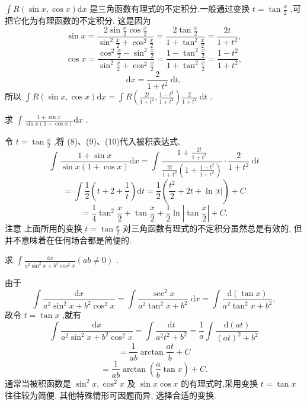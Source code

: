 \(\int R\left( {\sin x,\cos x}\right) \mathrm{d}x\) 是三角函数有理式的不定积分.一般通过变换 \(t = \tan \frac{x}{2}\) ,可把它化为有理函数的不定积分. 这是因为
\[
\sin x = \frac{2\sin \frac{x}{2}\cos \frac{x}{2}}{{\sin }^{2}\frac{x}{2} + {\cos }^{2}\frac{x}{2}} = \frac{2\tan \frac{x}{2}}{1 + {\tan }^{2}\frac{x}{2}} = \frac{2t}{1 + {t}^{2}}, \tag{8}
\]
\[
\cos x = \frac{{\cos }^{2}\frac{x}{2} - {\sin }^{2}\frac{x}{2}}{{\sin }^{2}\frac{x}{2} + {\cos }^{2}\frac{x}{2}} = \frac{1 - {\tan }^{2}\frac{x}{2}}{1 + {\tan }^{2}\frac{x}{2}} = \frac{1 - {t}^{2}}{1 + {t}^{2}}, \tag{9}
\]
\[
\mathrm{d}x = \frac{2}{1 + {t}^{2}}\mathrm{\;d}t, \tag{10}
\]
所以 \(\int R\left( {\sin x,\cos x}\right) \mathrm{d}x = \int R\left( {\frac{2t}{1 + {t}^{2}},\frac{1 - {t}^{2}}{1 + {t}^{2}}}\right) \frac{2}{1 + {t}^{2}}\mathrm{\;d}t\) .

\begin{example}

\end{example}
求 \(\int \frac{1 + \sin x}{\sin x\left( {1 + \cos x}\right) }\mathrm{d}x\) .

\begin{solution}

\end{solution}
令 \(t = \tan \frac{x}{2}\) ,将 (8)、(9)、(10)代入被积表达式,
\[
\int \frac{1 + \sin x}{\sin x\left( {1 + \cos x}\right) }\mathrm{d}x = \int \frac{1 + \frac{2t}{1 + {t}^{2}}}{\frac{2t}{1 + {t}^{2}}\left( {1 + \frac{1 - {t}^{2}}{1 + {t}^{2}}}\right) } \cdot  \frac{2}{1 + {t}^{2}}\mathrm{\;d}t
\]
\[
= \int \frac{1}{2}\left( {t + 2 + \frac{1}{t}}\right) \mathrm{d}t = \frac{1}{2}\left( {\frac{{t}^{2}}{2} + {2t} + \ln \left| t\right| }\right)  + C
\]
\[
= \frac{1}{4}{\tan }^{2}\frac{x}{2} + \tan \frac{x}{2} + \frac{1}{2}\ln \left| {\tan \frac{x}{2}}\right|  + C.
\]
注意 上面所用的变换 \(t = \tan \frac{x}{2}\) 对三角函数有理式的不定积分虽然总是有效的, 但并不意味着在任何场合都是简便的.

\begin{example}

\end{example}
求 \(\int \frac{\mathrm{d}x}{{a}^{2}{\sin }^{2}x + {b}^{2}{\cos }^{2}x}\left( {{ab} \neq  0}\right)\) .

\begin{solution}

\end{solution}
由于
\[
\int \frac{\mathrm{d}x}{{a}^{2}{\sin }^{2}x + {b}^{2}{\cos }^{2}x} = \int \frac{{\sec }^{2}x}{{a}^{2}{\tan }^{2}x + {b}^{2}}\mathrm{\;d}x = \int \frac{\mathrm{d}\left( {\tan x}\right) }{{a}^{2}{\tan }^{2}x + {b}^{2}},
\]
故令 \(t = \tan x\) ,就有
\[
\int \frac{\mathrm{d}x}{{a}^{2}{\sin }^{2}x + {b}^{2}{\cos }^{2}x} = \int \frac{\mathrm{d}t}{{a}^{2}{t}^{2} + {b}^{2}} = \frac{1}{a}\int \frac{\mathrm{d}\left( {at}\right) }{{\left( at\right) }^{2} + {b}^{2}}
\]
\[
= \frac{1}{ab}\arctan \frac{at}{b} + C
\]
\[
= \frac{1}{ab}\arctan \left( {\frac{a}{b}\tan x}\right)  + C.
\]
通常当被积函数是 \({\sin }^{2}x,{\cos }^{2}x\) 及 \(\sin x\cos x\) 的有理式时,采用变换 \(t = \tan x\) 往往较为简便. 其他特殊情形可因题而异, 选择合适的变换.

